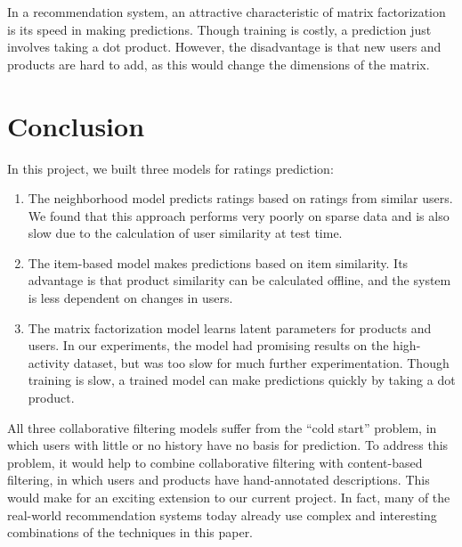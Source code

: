 \documentclass[letterpaper, 11 pt, conference]{ieeeconf}
\begin{document}
In a recommendation system, an attractive characteristic of matrix 
factorization is its speed in making predictions. Though training is costly, 
a prediction just involves taking a dot product. However, the disadvantage is 
that new users and products are hard to add, as this would change the 
dimensions of the matrix. 

\section{Conclusion}
In this project, we built three models for ratings prediction:
\begin{enumerate}
\item The neighborhood model predicts ratings based on ratings from similar 
users. We found that this approach performs very poorly on sparse data and is 
also slow due to the calculation of user similarity at test time.

\item The item-based model makes predictions based on item similarity. Its 
advantage is that product similarity can be calculated offline, and the system 
is less dependent on changes in users. 

\item The matrix factorization model learns latent parameters for products and 
users. In our experiments, the model had promising results on the high-activity 
dataset, but was too slow for much further experimentation. Though training is 
slow, a trained model can make predictions quickly by taking a dot product. 

\end{enumerate}

All three collaborative filtering models suffer from the ``cold start'' 
problem, in which users with little or no history have no basis for prediction. 
To address this problem, it would help to combine collaborative filtering with 
content-based filtering, in which users and products have hand-annotated 
descriptions. This would make for an exciting extension to our current project. 
In fact, many of the real-world recommendation systems today 
already use complex and interesting combinations of the techniques in this 
paper.
\end{document}
